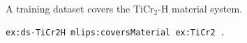 A training dataset covers the TiCr$_2$-H material system.
\begin{lstlisting}[language=turtle]
ex:ds-TiCr2H mlips:coversMaterial ex:TiCr2 .
\end{lstlisting}
